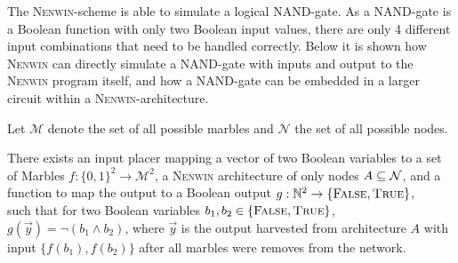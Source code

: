 The \textsc{Nenwin}-scheme is able to simulate a logical NAND-gate.
As a NAND-gate is a Boolean function with only two Boolean input values, there are only 4 different input combinations that need to be handled correctly. Below it is shown how \textsc{Nenwin} can directly simulate a NAND-gate with inputs and output to the \textsc{Nenwin} program itself, and how a NAND-gate can be embedded in a larger circuit within a \textsc{Nenwin}-architecture. 

Let $\mathcal{M}$ denote the set of all possible marbles and $\mathcal{N}$ the set of all possible nodes. 
\begin{lemma}
There exists an input placer mapping a vector of two Boolean variables to a set of Marbles $f:\{0, 1\}^2 \rightarrow\mathcal{M}^2$,
a \textsc{Nenwin} architecture of only nodes $A \subseteq \mathcal{N}$, and a function to map the \nenwin output to a Boolean output $g:\mathbb{N}^2 \rightarrow \{\textsc{False}, \textsc{True}\}$,\\
such that for two Boolean variables $b_1, b_2 \in \{\textsc{False}, \textsc{True}\}$, $g(\vec{y}) = \neg (b_1 \land b_2)$, where $\vec{y}$ is the output harvested from architecture $A$ with input $\{f(b_1), f(b_2)\}$ after all marbles were removes from the network.
\label{lemmma:nand_simple}
\end{lemma}
